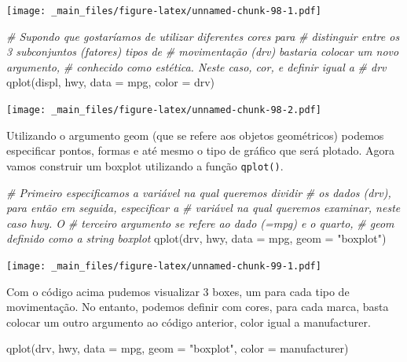 \documentclass[
]{book}
\newenvironment{Shaded}{\begin{snugshade}}{\end{snugshade}}
\newcommand{\AttributeTok}[1]{\textcolor[rgb]{0.77,0.63,0.00}{#1}}
\newcommand{\CommentTok}[1]{\textcolor[rgb]{0.56,0.35,0.01}{\textit{#1}}}
\newcommand{\FunctionTok}[1]{\textcolor[rgb]{0.00,0.00,0.00}{#1}}
\newcommand{\NormalTok}[1]{#1}
\newcommand{\StringTok}[1]{\textcolor[rgb]{0.31,0.60,0.02}{#1}}
\begin{document}
\texttt{[image: \_main\_files/figure-latex/unnamed-chunk-98-1.pdf]}

\begin{Shaded}
\begin{Highlighting}[]
\CommentTok{\# Supondo que gostaríamos de utilizar diferentes cores para}
\CommentTok{\# distinguir entre os 3 subconjuntos (fatores) tipos de}
\CommentTok{\# movimentação (drv) bastaria colocar um novo argumento,}
\CommentTok{\# conhecido como estética. Neste caso, cor, e definir igual a}
\CommentTok{\# drv}
\FunctionTok{qplot}\NormalTok{(displ, hwy, }\AttributeTok{data =}\NormalTok{ mpg, }\AttributeTok{color =}\NormalTok{ drv)}
\end{Highlighting}
\end{Shaded}

\texttt{[image: \_main\_files/figure-latex/unnamed-chunk-98-2.pdf]}

Utilizando o argumento geom (que se refere aos objetos geométricos) podemos especificar pontos, formas e até mesmo o tipo de gráfico que será plotado. Agora vamos construir um boxplot utilizando a função \texttt{qplot()}.

\begin{Shaded}
\begin{Highlighting}[]
\CommentTok{\# Primeiro especificamos a variável na qual queremos dividir}
\CommentTok{\# os dados (drv), para então em seguida, especificar a}
\CommentTok{\# variável na qual queremos examinar, neste caso hwy. O}
\CommentTok{\# terceiro argumento se refere ao dado (=mpg) e o quarto,}
\CommentTok{\# geom definido como a string \textquotesingle{}boxplot\textquotesingle{}}
\FunctionTok{qplot}\NormalTok{(drv, hwy, }\AttributeTok{data =}\NormalTok{ mpg, }\AttributeTok{geom =} \StringTok{"boxplot"}\NormalTok{)}
\end{Highlighting}
\end{Shaded}

\texttt{[image: \_main\_files/figure-latex/unnamed-chunk-99-1.pdf]}

Com o código acima pudemos visualizar 3 boxes, um para cada tipo de movimentação. No entanto, podemos definir com cores, para cada marca, basta colocar um outro argumento ao código anterior, color igual a manufacturer.

\begin{Shaded}
\begin{Highlighting}[]
\FunctionTok{qplot}\NormalTok{(drv, hwy, }\AttributeTok{data =}\NormalTok{ mpg, }\AttributeTok{geom =} \StringTok{"boxplot"}\NormalTok{, }\AttributeTok{color =}\NormalTok{ manufacturer)}
\end{Highlighting}
\end{Shaded}
\end{document}
